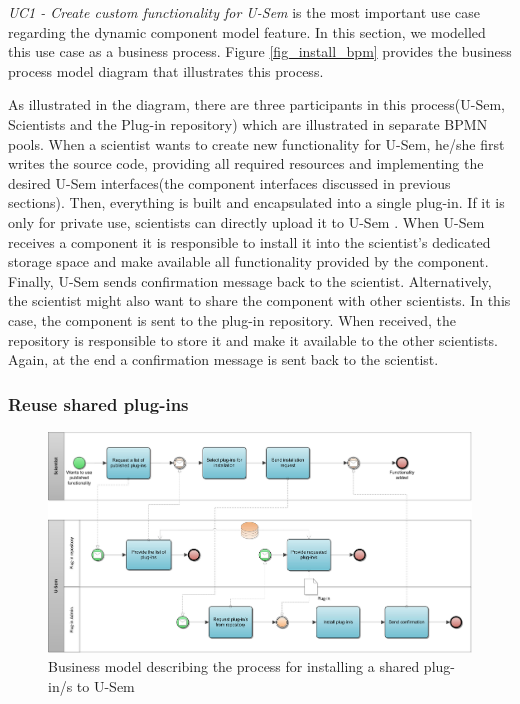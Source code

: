 \textit{UC1 - Create custom functionality for U-Sem} is the most important use case regarding the dynamic component model feature. In this section, we modelled this use case as a business process. Figure \ref{fig_install_bpm} provides the business process model diagram that illustrates this process. 

As illustrated in the diagram, there are three participants in this process(U-Sem, Scientists and the Plug-in repository) which are illustrated in separate BPMN pools. When a scientist wants to create new functionality for U-Sem, he/she first writes the source code, providing all required resources and implementing the desired U-Sem interfaces(the component interfaces discussed in previous sections). Then, everything is built and encapsulated into a single plug-in. If it is only for private use, scientists can directly upload it to U-Sem . When U-Sem receives a component it is responsible to install it into the scientist's dedicated storage space and make available all functionality provided by the component. Finally, U-Sem sends confirmation message back to the scientist. Alternatively, the scientist might also want to share the component with other scientists. In this case, the component is sent to the plug-in repository. When received, the repository is responsible to store it and make it available to the other scientists. Again, at the end a confirmation message is sent back to the scientist.

\subsubsection{Reuse shared plug-ins}

\begin{figure}[h!]
  \centering
  	\includegraphics[scale=0.7,angle=90]{plug-in/business_processes/InstallPlugInFromRepoBusinessModel.jpg}
  \caption{Business model describing the process for installing a shared plug-in/s to U-Sem}
  \label{fig_repo_bpm}
\end{figure}

